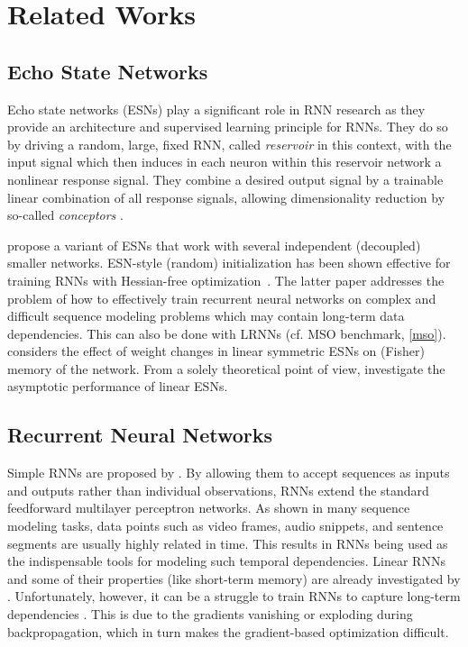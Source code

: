 \documentclass[twoside,11pt]{article}
\theoremstyle{definition}
\begin{document}
\section{Related Works}\label{related}

\subsection{Echo State Networks}

Echo state networks (ESNs) \citep{JH04,Jae07} play a significant role in RNN
research as they provide an architecture and supervised learning principle for
RNNs. They do so by driving a random, large, fixed RNN, called \emph{reservoir}
in this context, with the input signal which then induces in each neuron within
this reservoir network a nonlinear response signal. They combine a desired
output signal by a trainable linear combination of all response signals,
allowing dimensionality reduction by so-called \emph{conceptors} \citep{Jae14,Jae17}.

\citet{XYH07} propose a variant of ESNs that work with several independent
(decoupled) smaller networks. ESN-style (random) initialization has been shown
effective for training RNNs with Hessian-free optimization~\citep{MS11}. The
latter paper addresses the problem of how to effectively train recurrent neural
networks on complex and difficult sequence modeling problems which may contain
long-term data dependencies. This can also be done with LRNNs (cf. MSO
benchmark, \cref{mso}).
\citet{Tin18} considers the effect of weight changes in linear symmetric ESNs on
(Fisher) memory of the network. From a solely theoretical point of view,
\citet{CW+16} investigate the asymptotic performance of linear ESNs.

\subsection{Recurrent Neural Networks}

Simple RNNs are proposed by \citet{Elm90}. By allowing them to accept sequences
as inputs and outputs rather than individual observations, RNNs extend the
standard feedforward multilayer perceptron networks. As shown in many sequence
modeling tasks, data points such as video frames, audio snippets, and sentence
segments are usually highly related in time. This results in RNNs being used as
the indispensable tools for modeling such temporal dependencies. Linear RNNs and
some of their properties (like short-term memory) are already investigated by
\citet{WLS94}. Unfortunately, however, it can be a struggle to train RNNs to
capture long-term dependencies \citep{BSF94,PMB13}. This is due to the
gradients vanishing or exploding during backpropagation, which in turn makes the
gradient-based optimization difficult.
\end{document}
